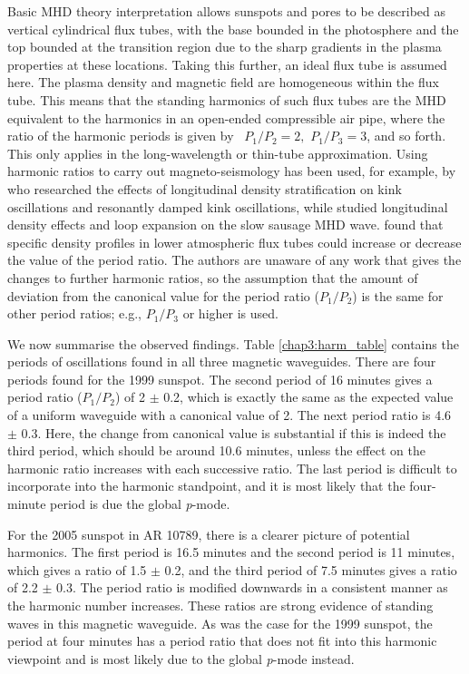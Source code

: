 	Basic MHD theory interpretation allows sunspots and pores to be described as vertical cylindrical flux tubes, with the base bounded in the photosphere and the top bounded at the transition region due to the sharp gradients in the plasma properties at these locations.
	Taking this further, an ideal flux tube is assumed here.
	The plasma density and magnetic field are homogeneous within the flux tube.
	This means that the standing harmonics of such flux tubes are the MHD equivalent to the harmonics in an open-ended compressible air pipe, where the ratio of the harmonic periods is given by \, $P_{1}/P_{2}=2, \,\, P_{1}/P_{3}=3$, and so forth.
	This only applies in the long-wavelength or thin-tube approximation.
	Using harmonic ratios to carry out magneto-seismology has been used, for example, by \citet{2005ApJ...624L..57A,2005A&A...430.1109A} who researched the effects of longitudinal density stratification on kink oscillations and resonantly damped kink oscillations, while \citet{luna-cardozo} studied longitudinal density effects and loop expansion on the slow sausage MHD wave.
	\citet{luna-cardozo} found that specific density profiles in lower atmospheric flux tubes could increase or decrease the value of the period ratio.
	The authors are unaware of any work that gives the changes to further harmonic ratios, so the assumption that the amount of deviation from the canonical value for the period ratio ($P_{1}/P_{2}$) is the same for other period ratios; e.g., $P_{1}/P_{3}$ or higher is used.
	
	We now summarise the observed findings. Table \ref{chap3:harm_table} contains the periods of oscillations found in all three magnetic waveguides.
	There are four periods found for the 1999 sunspot.
	The second period of 16 minutes gives a period ratio ($P_{1}/P_{2}$) of 2 $\pm$ 0.2, which is exactly the same as the expected value of a uniform waveguide with a canonical value of 2.
	The next period ratio is 4.6 $\pm$ 0.3.
	Here, the change from canonical value is substantial if this is indeed the third period, which should be around 10.6 minutes, unless the effect on the harmonic ratio increases with each successive ratio.
	The last period is difficult to incorporate into the harmonic standpoint, and it is most likely that the four-minute period is due the global \textit{p}-mode.
	
	For the 2005 sunspot in AR 10789, there is a clearer picture of potential harmonics.
	The first period is 16.5 minutes and the second period is 11 minutes, which gives a ratio of 1.5 $\pm$ 0.2, and the third period of 7.5 minutes gives a ratio of 2.2 $\pm$ 0.3.
	The period ratio is modified downwards in a consistent manner as the harmonic number increases.
	These ratios are strong evidence of standing waves in this magnetic waveguide.
	As was the case for the 1999 sunspot, the period at four minutes has a period ratio that does not fit into this harmonic viewpoint and is most likely due to the global \textit{p}-mode instead.
	

